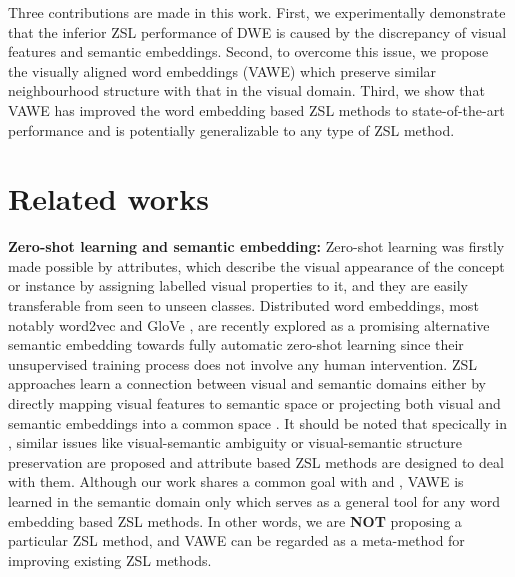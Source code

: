 \documentclass{bmvc2k}
\begin{document}
%

Three contributions are made in this work. First, we experimentally demonstrate that the inferior ZSL performance of DWE is caused by the discrepancy of visual features and semantic embeddings. Second, to overcome this issue, we propose the visually aligned word embeddings (VAWE) which preserve similar neighbourhood structure with that in the visual domain. Third, we show that VAWE has improved the word embedding based ZSL methods to state-of-the-art performance and is potentially generalizable to any type of ZSL method.

\section{Related works}
\label{sec: rel_work}{\bf Zero-shot learning and semantic embedding:} Zero-shot learning was firstly made possible by attributes\cite{Lampert09unseen,Farhadi09describingobjects}, which describe the visual appearance of the concept or instance by assigning labelled visual properties to it, and they are easily transferable from seen to unseen classes. Distributed word embeddings, most notably word2vec \cite{word2vec} and GloVe \cite{glove}, are recently explored \cite{SocherNIPS2013,Frome2013NIPS_devise,NorouziConse13} as a promising alternative semantic embedding towards fully automatic zero-shot learning since their unsupervised training process does not involve any human intervention. ZSL approaches learn a connection between visual and semantic domains either by directly mapping visual features to semantic space \cite{SocherNIPS2013,NorouziConse13,fu2016semi} or projecting both visual and semantic embeddings into a common space \cite{Akata13label,Frome2013NIPS_devise,Romera2015ZSL,Akata15output,LatEm2016,Zhang2016CVPR, LongBMVC16, SaumyaBMVC15, LiICCV15}. It should be noted that specically in \cite{LongBMVC16, LongCVPR17}, similar issues like visual-semantic ambiguity or visual-semantic structure preservation are proposed and attribute based ZSL methods are designed to deal with them. Although our work shares a common goal with \cite{LongBMVC16} and \cite{LongCVPR17}, VAWE is learned in the semantic domain only which serves as a general tool for any word embedding based ZSL methods. In other words, we are {\bf NOT} proposing a particular ZSL method, and VAWE can be regarded as a meta-method for improving existing ZSL methods.
\end{document}
